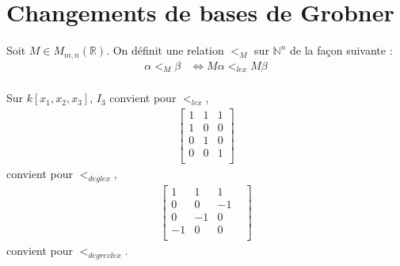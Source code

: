     \section{Changements de bases de Grobner}
        \begin{defi}
            Soit $M \in M_{m,n}(\mathbb{R})$. On définit une relation $<_M$ sur $\mathbb{N}^n$ de la façon suivante :
            \begin{align*}
                \alpha <_M \beta &\iff M \alpha <_{lex} M \beta \\
            \end{align*}
        \end{defi}
        \begin{expl}
            Sur $k[x_1, x_2, x_3]$, $I_3$ convient pour $<_{lex}$,
            \begin{align*}
                \begin{bmatrix}
                    1 & 1 & 1 \\
                    1 & 0 & 0 \\
                    0 & 1 & 0 \\
                    0 & 0 & 1 \\
                \end{bmatrix}
            \end{align*}
            convient pour $<_{deglex}$,
            \begin{align*}
                \begin{bmatrix}
                    1 & 1 & 1 \\
                    0 & 0 & -1 \\
                    0 & -1 & 0 \\
                    -1 & 0 & 0 &\\
                \end{bmatrix}
            \end{align*}
            convient pour $<_{degrevlex}$.
        \end{expl}